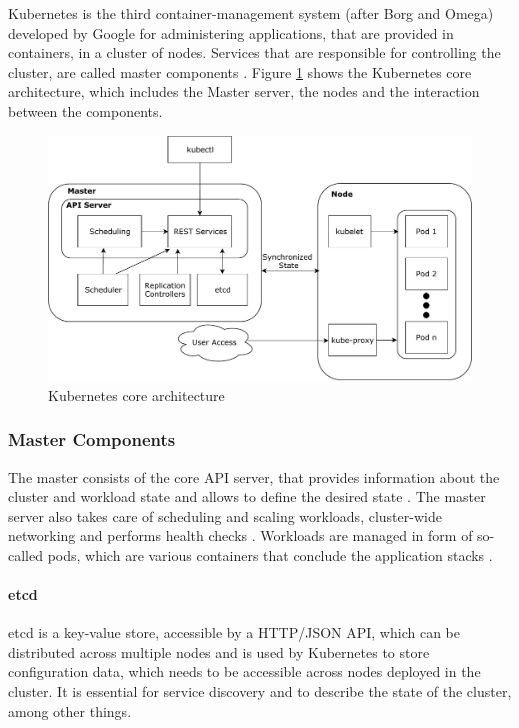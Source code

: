 Kubernetes is the third container-management system (after Borg and
Omega) developed by Google \cite{Burns:2016uq} for administering
applications, that are provided in containers, in a cluster of nodes.
Services that are responsible for controlling the cluster, are called
master components \cite{kub_intro}. Figure
\ref{kubernetes_core_architecture} shows the Kubernetes core
architecture, which includes the Master server, the nodes and the
interaction between the components.

\begin{figure}
\centering
\includegraphics[width=15.00000cm]{images/kubernetes_core_architecture}
\caption{Kubernetes core
architecture\label{kubernetes_core_architecture} \cite{baier-kub}}
\end{figure}

\subsubsection{Master Components}\label{master-components}

The master consists of the core API server, that provides information
about the cluster and workload state and allows to define the desired
state \cite{baier-kub}. The master server also takes care of scheduling
and scaling workloads, cluster-wide networking and performs health
checks \cite{kub_intro}. Workloads are managed in form of so-called
pods, which are various containers that conclude the application stacks
\cite{baier-kub}.

\paragraph{etcd}\label{etcd}

etcd is a key-value store, accessible by a HTTP/JSON API, which can be
distributed across multiple nodes and is used by Kubernetes to store
configuration data, which needs to be accessible across nodes deployed
in the cluster. It is essential for service discovery and to describe
the state of the cluster, among other things. \cite{kub_intro}

